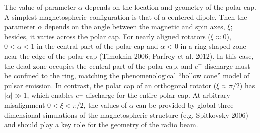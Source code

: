 The value of parameter $\alpha$ depends
on the location and geometry of the polar cap.
A simplest magnetospheric configuration is that of a centered dipole. Then
the parameter $\alpha$ depends on the angle between the magnetic and spin axes,
$\xi$; besides, it varies across the polar cap. For nearly
aligned rotators ($\xi\approx 0$),
$0<\alpha<1$ in the central part of the polar cap and $\alpha<0$
in a ring-shaped zone near the edge of the polar cap
(Timokhin 2006; Parfrey et al. 2012).
In this case, the dead zone occupies the
central part of the polar cap, and $e^\pm$ discharge must be confined to the ring,
matching the phenomenological ``hollow cone'' model of pulsar emission.
In contrast, the polar cap of an orthogonal rotator ($\xi\approx \pi/2$) has
$|\alpha|\gg 1$, which
enables $e^\pm$ discharge
for the entire polar cap.
At arbitrary misalignment $0<\xi<\pi/2$,
the values of $\alpha$
can be provided by global three-dimensional simulations
of the magnetospheric structure (e.g. Spitkovsky 2006) and should play a key
role for the geometry of the radio beam.




